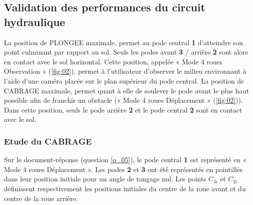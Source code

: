 
\subsection{Validation des performances du circuit hydraulique}

La position de PLONGEE maximale, permet au pode central \textbf{1} d’atteindre son point culminant par rapport au sol. Seuls les podes avant \textbf{3} / arrière \textbf{2} sont alors en contact avec le sol horizontal. Cette position, appelée « Mode 4 roues Observation » (\autoref{fig:02}), permet à l’utilisateur d’observer le milieu environnant à l’aide d’une caméra placée sur le plan supérieur du pode central. La position de CABRAGE maximale, permet quant à elle de soulever le pode avant le plus haut possible afin de franchir un obstacle (« Mode 4 roues Déplacement » (\autoref{fig:02})). Dans cette position, seuls le pode arrière \textbf{2} et le pode central \textbf{2} sont en contact avec le sol.

\subsubsection{Etude du CABRAGE}

Sur le document-réponse (question \ref{q_05}), le pode central \textbf{1} est représenté en « Mode 4 roues Déplacement ». Les podes \textbf{2} et \textbf{3} ont été représentés en pointillés dans leur position initiale pour un angle de tangage nul. Les points $C_{3i}$ et $C_{2i}$ définissent respectivement les positions initiales du centre de la roue avant et du centre de la roue arrière.


